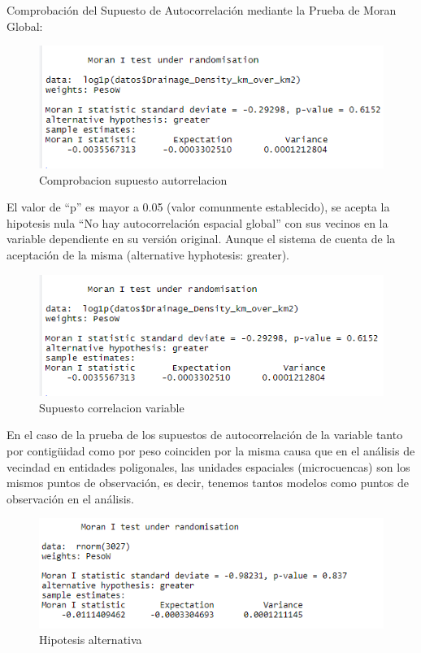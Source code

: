 \documentclass[11pt,]{article}
\begin{document}
Comprobación del Supuesto de Autocorrelación mediante la Prueba de Moran
Global:

\begin{figure}
\centering
\includegraphics{Imagenes/gmoranW.png}
\caption{Comprobacion supuesto autorrelacion}
\end{figure}

El valor de ``p'' es mayor a 0.05 (valor comunmente establecido), se
acepta la hipotesis nula ``No hay autocorrelación espacial global'' con
sus vecinos en la variable dependiente en su versión original. Aunque el
sistema de cuenta de la aceptación de la misma (alternative hyphotesis:
greater).

\begin{figure}
\centering
\includegraphics{Imagenes/gmoranWB.png}
\caption{Supuesto correlacion variable}
\end{figure}

En el caso de la prueba de los supuestos de autocorrelación de la
variable tanto por contigüidad como por peso coinciden por la misma
causa que en el análisis de vecindad en entidades poligonales, las
unidades espaciales (microcuencas) son los mismos puntos de observación,
es decir, tenemos tantos modelos como puntos de observación en el
análisis.

\begin{figure}
\centering
\includegraphics{Imagenes/gmoranWBhip.png}
\caption{Hipotesis alternativa}
\end{figure}
\end{document}
